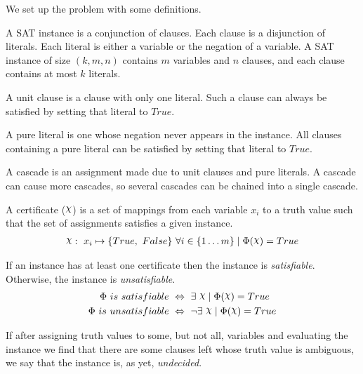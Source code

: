 We set up the problem with some definitions.


\begin{definition}
\label{def:instance}
    A SAT instance is a conjunction of clauses.
    Each clause is a disjunction of literals.
    Each literal is either a variable or the negation of a variable.
    A SAT instance of size $(k, m, n)$ contains $m$ variables and $n$ clauses, and each clause contains at most $k$ literals.
\end{definition}

\begin{definition}
\label{def:unit-clause}
    A unit clause is a clause with only one literal.
    Such a clause can always be satisfied by setting that literal to $True$.
\end{definition}

\begin{definition}
\label{def:pure-literal}
    A pure literal is one whose negation never appears in the instance.
    All clauses containing a pure literal can be satisfied by setting that literal to $True$.
\end{definition}

\begin{definition}[Cascade]
\label{def:cascade}
    A cascade is an assignment made due to unit clauses and pure literals.
    A cascade can cause more cascades, so several cascades can be chained into a single cascade.
\end{definition}

\begin{definition}[Certificate]
\label{def:certificate}
    A certificate ($\rchi$) is a set of mappings from each variable $x_i$ to a truth value such that the set of assignments satisfies a given instance.
    \begin{align*}
        \rchi :~ x_i \mapsto \{ True,~ False \}~ \forall i \in \{ 1 \ldots m \}
        \mid \Phi(\rchi) = True
    \end{align*}
\end{definition}

\begin{definition}[Satisfiability]
\label{def:satisfiability}
    If an instance has at least one certificate then the instance is \textit{satisfiable}.
    Otherwise, the instance is \textit{unsatisfiable}.
    \begin{align*}
        \Phi~ is~ satisfiable~ & \Leftrightarrow~ \exists~ \rchi \mid \Phi(\rchi) = True \\
        \Phi~ is~ unsatisfiable~ & \Leftrightarrow~ \lnot \exists~ \rchi \mid \Phi(\rchi) = True
    \end{align*}

    If after assigning truth values to some, but not all, variables and evaluating the instance we find that there are some clauses left whose truth value is ambiguous, we say that the instance is, as yet, \textit{undecided}.
\end{definition}

